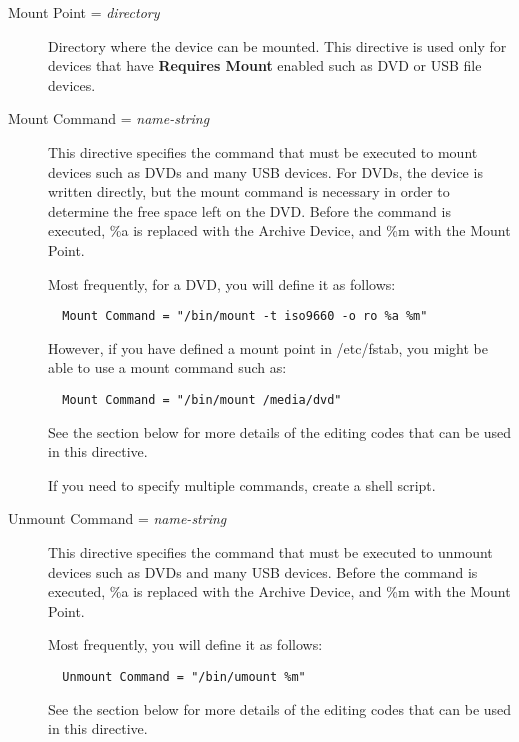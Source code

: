 \begin{description}
\item [Mount Point = {\it directory}]
   Directory where the device can be mounted. 
   This directive is used only
   for devices that have {\bf Requires Mount} enabled such as DVD or 
   USB file devices.

\item [Mount Command = {\it name-string}]
   This directive specifies the command that must be executed to mount 
   devices such as DVDs and many USB devices. For DVDs, the
   device is written directly, but the mount command is necessary in
   order to determine the free space left on the DVD. Before the command is 
   executed, \%a is replaced with the Archive Device, and \%m with the Mount 
   Point.

   Most frequently, for a DVD, you will define it as follows:  

\footnotesize
\begin{verbatim}
  Mount Command = "/bin/mount -t iso9660 -o ro %a %m"
\end{verbatim}
\normalsize

However, if you have defined a mount point in /etc/fstab, you might be
able to use a mount command such as:

\footnotesize
\begin{verbatim}
  Mount Command = "/bin/mount /media/dvd"
\end{verbatim}
\normalsize

See the  section below for more details of
the editing codes that can be used in this directive.

  If you need to specify multiple commands, create a shell script.

\item [Unmount Command = {\it name-string}]
   This directive specifies the command that must be executed to unmount 
   devices such as DVDs and many USB devices. Before the command  is
   executed, \%a is replaced with the Archive Device, and \%m with the  Mount
   Point.

   Most frequently, you will define it as follows:  

\footnotesize
\begin{verbatim}
  Unmount Command = "/bin/umount %m"
\end{verbatim}
\normalsize

See the  section below for more details of
the editing codes that can be used in this directive.


\end{description}
